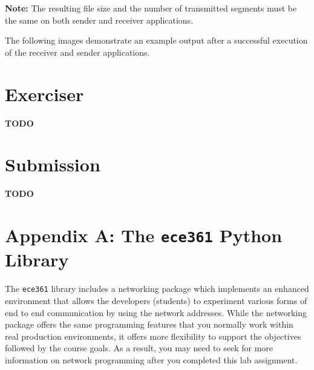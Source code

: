 \documentclass[11pt]{article}
\begin{document}

\textbf{Note:}
The resulting file size and the number of transmitted segments must be the same on both sender and receiver applications.


The following images demonstrate an example output after a successful execution of the receiver and sender applications.


\section{Exerciser}
\label{sec:exercise}
\textbf{TODO}

\section{Submission}
\label{sec:submission}
\textbf{TODO}

\newpage
\section{Appendix A: The \texttt{ece361} Python Library}
\label{sec:appendix-ece361-lib}
The \texttt{ece361} library includes a networking package which implements an enhanced environment that allows the developers (students) to experiment various forms of end to end communication by using the network addresses. While the networking package offers the same programming features that you normally work within real production environments, it offers more flexibility to support the objectives followed by the course goals. As a result, you may need to seek for more information on network programming after you completed this lab assignment.
\end{document}
